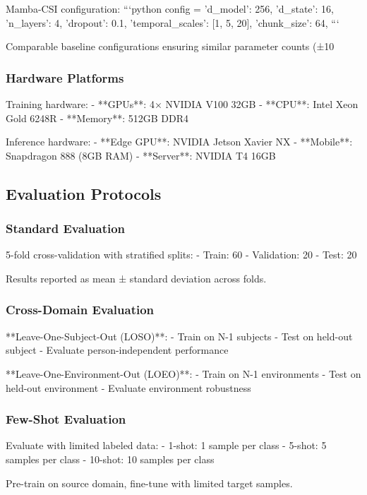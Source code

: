 \documentclass[10pt,journal,compsoc]{IEEEtran}
\begin{document}
Mamba-CSI configuration:
```python
config = {
    'd_model': 256,
    'd_state': 16,
    'n_layers': 4,
    'dropout': 0.1,
    'temporal_scales': [1, 5, 20],
    'chunk_size': 64,
}
```

Comparable baseline configurations ensuring similar parameter counts (±10%

\subsubsection{Hardware Platforms}

Training hardware:
- **GPUs**: 4× NVIDIA V100 32GB
- **CPU**: Intel Xeon Gold 6248R
- **Memory**: 512GB DDR4

Inference hardware:
- **Edge GPU**: NVIDIA Jetson Xavier NX
- **Mobile**: Snapdragon 888 (8GB RAM)
- **Server**: NVIDIA T4 16GB

\subsection{Evaluation Protocols}

\subsubsection{Standard Evaluation}

5-fold cross-validation with stratified splits:
- Train: 60%
- Validation: 20%
- Test: 20%

Results reported as mean ± standard deviation across folds.

\subsubsection{Cross-Domain Evaluation}

**Leave-One-Subject-Out (LOSO)**:
- Train on N-1 subjects
- Test on held-out subject
- Evaluate person-independent performance

**Leave-One-Environment-Out (LOEO)**:
- Train on N-1 environments
- Test on held-out environment
- Evaluate environment robustness

\subsubsection{Few-Shot Evaluation}

Evaluate with limited labeled data:
- 1-shot: 1 sample per class
- 5-shot: 5 samples per class
- 10-shot: 10 samples per class

Pre-train on source domain, fine-tune with limited target samples.
\end{document}
